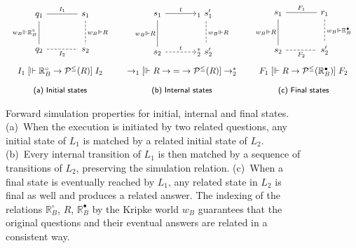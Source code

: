 \documentclass[acmsmall,authordraft]{acmart}
\newcommand{\ifr}[1]{\mathrel{[{#1}]}}
\newcommand{\que}{\circ}
\newcommand{\ans}{\bullet}
\begin{document}
\begin{figure} %
  \[
    \begin{array}{c@{\qquad}c@{\qquad}c}
      \begin{tikzcd}[sep=large]
        q_1 \ar[d, "w_B \Vdash \mathbb{R}_B^\que"', dash] \ar[r, dash, "I_1"] &
        s_1 \ar[d, "w_B \Vdash R", dash, dashed] \\
        q_2 \ar[r, "I_2"', dash, dashed] &
        s_2
      \end{tikzcd}
      &
      \begin{tikzcd}[sep=large]
        s_1 \ar[r, "t"] \ar[d, "w_B \Vdash R"', dash] &
        \!\!{}_1 \:\, s_1' \ar[d, "w_B \Vdash R", dash, dashed] \\
        s_2 \ar[r, "t", dashed] &
        \!\!{}_2^* \:\, s_2'
      \end{tikzcd}
      &
      \begin{tikzcd}[sep=large]
        s_1 \ar[r, "F_1", dash] \ar[d, "w_B \Vdash R"', dash] &
        r_1 \ar[d, "w_B \Vdash \mathbb{R}_B^\ans", dash, dashed] \\
        s_2 \ar[r, "F_2"', dash, dashed] &
        s_2'
      \end{tikzcd}
      \\[3.5em]
      I_1 \ifr{\Vdash \mathbb{R}_B^\que \rightarrow \mathcal{P}^\le(R)} I_2
      &
      {\rightarrow_1}
      \ifr{\Vdash R \rightarrow {=} \rightarrow \mathcal{P}^\le(R)}
      {\rightarrow_2^*}
      &
      F_1
      \ifr{\Vdash R \rightarrow \mathcal{P}^\le(\mathbb{R}_B^\ans)}
      F_2
      \\[1em]
      \small \textsf{(a) Initial states} &
      \small \textsf{(b) Internal states} &
      \small \textsf{(c) Final states}
    \end{array}
  \]
  \caption{Forward simulation properties for initial, internal and final states.
    (a)~When the execution is initiated by two related questions,
    any initial state of $L_1$ is matched by
    a related initial state of $L_2$.
    (b)~Every internal transition of $L_1$ is then matched by
    a sequence of transitions of $L_2$,
    preserving the simulation relation.
    (c)~When a final state is eventually reached by $L_1$,
    any related state in $L_2$ is final as well and
    produces a related answer.
    The indexing of the relations
    $\mathbb{R}_B^\que$, $R$, $\mathbb{R}_B^\ans$
    by the Kripke world $w_B$
    guarantees that the original questions and their eventual answers
    are related in a consistent way.}
  \label{fig:fsim}
\end{figure}
\end{document}
